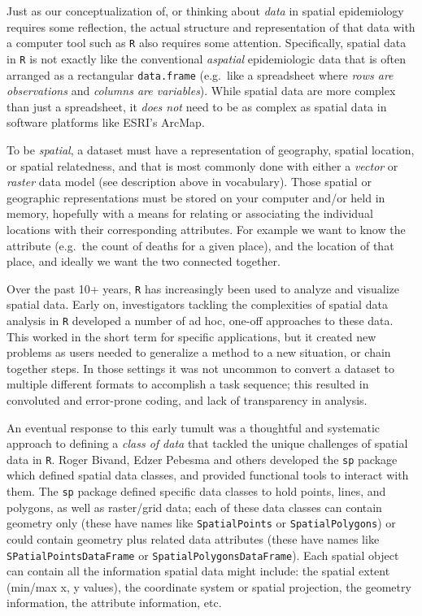 \documentclass[
]{book}
\begin{document}
Just as our conceptualization of, or thinking about \emph{data} in spatial epidemiology requires some reflection, the actual structure and representation of that data with a computer tool such as \texttt{R} also requires some attention. Specifically, spatial data in \texttt{R} is not exactly like the conventional \emph{aspatial} epidemiologic data that is often arranged as a rectangular \texttt{data.frame} (e.g.~like a spreadsheet where \emph{rows are observations} and \emph{columns are variables}). While spatial data are more complex than just a spreadsheet, it \emph{does not} need to be as complex as spatial data in software platforms like ESRI's ArcMap.

To be \emph{spatial}, a dataset must have a representation of geography, spatial location, or spatial relatedness, and that is most commonly done with either a \emph{vector} or \emph{raster} data model (see description above in vocabulary). Those spatial or geographic representations must be stored on your computer and/or held in memory, hopefully with a means for relating or associating the individual locations with their corresponding attributes. For example we want to know the attribute (e.g.~the count of deaths for a given place), and the location of that place, and ideally we want the two connected together.

Over the past 10+ years, \texttt{R} has increasingly been used to analyze and visualize spatial data. Early on, investigators tackling the complexities of spatial data analysis in \texttt{R} developed a number of ad hoc, one-off approaches to these data. This worked in the short term for specific applications, but it created new problems as users needed to generalize a method to a new situation, or chain together steps. In those settings it was not uncommon to convert a dataset to multiple different formats to accomplish a task sequence; this resulted in convoluted and error-prone coding, and lack of transparency in analysis.

An eventual response to this early tumult was a thoughtful and systematic approach to defining a \emph{class of data} that tackled the unique challenges of spatial data in \texttt{R}. Roger Bivand, Edzer Pebesma and others developed the \texttt{sp} package which defined spatial data classes, and provided functional tools to interact with them. The \texttt{sp} package defined specific data classes to hold points, lines, and polygons, as well as raster/grid data; each of these data classes can contain geometry only (these have names like \texttt{SpatialPoints} or \texttt{SpatialPolygons}) or could contain geometry plus related data attributes (these have names like \texttt{SPatialPointsDataFrame} or \texttt{SpatialPolygonsDataFrame}). Each spatial object can contain all the information spatial data might include: the spatial extent (min/max x, y values), the coordinate system or spatial projection, the geometry information, the attribute information, etc.
\end{document}
